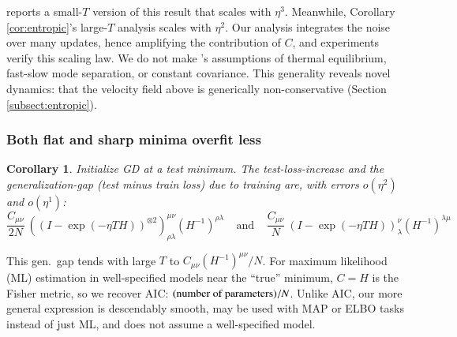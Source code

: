 \documentclass{article}
\theoremstyle{plain}
\newtheorem{cor}{Corollary}
\theoremstyle{definition}
\newcommand{\wrap}[1]{\left(#1\right)}
\newcommand{\rvalue}{\text{\textnormal{rvalue}}}
\newcommand{\sizeddia}[2]{
    \begin{gathered}
        \texttt{[image: ../diagrams/\#1.png]}
    \end{gathered}
}
\newcommand{\sdia}[1]{\protect \sizeddia{#1}{0.10}}
\begin{document}
            \cite{ya19b} reports a small-$T$ version of this result that
            scales with $\eta^3$.  Meanwhile, Corollary \ref{cor:entropic}'s
            large-$T$ analysis scales with $\eta^2$.  Our analysis integrates
            the noise over many updates, hence amplifying the contribution of
            $C$, and experiments verify this scaling law.
            We do not make \cite{we19b}'s assumptions of thermal equilibrium,
            fast-slow mode separation, or constant covariance.  This generality
            reveals novel dynamics: that the velocity field above is
            generically non-conservative (Section \ref{subsect:entropic}).
      
        \subsubsection{Both flat and sharp minima overfit less} \label{subsect:curvature-and-overfitting}
    
            \begin{cor}\label{cor:overfit}
                Initialize GD at a test minimum.  The test-loss-increase and the
                generalization-gap (test minus train loss) due to training are,
                with errors $o(\eta^2)$ and $o(\eta^1)$:
                $$
                    \frac{C_{\mu\nu}}{2N} ~
                        \wrap{(I - \exp(-\eta T H))^{\otimes 2}}^{\mu\nu}_{\rho\lambda}
                        \wrap{H^{-1}}^{\rho\lambda}
                    ~~~~~ \text{and} ~~~~~
                    \frac{C_{\mu\nu}}{N} ~
                        \wrap{I - \exp(-\eta T H)}^{\nu}_{\lambda}
                        \wrap{H^{-1}}^{\lambda\mu}
                $$
            \end{cor}
            This gen.\ gap tends with large $T$ 
            to $C_{\mu\nu}(H^{-1})^{\mu\nu}/N$.  For maximum
            likelihood (ML) estimation in well-specified models near the ``true''
            minimum, $C=H$ is the Fisher metric, so we recover AIC:
            $(\textnormal{number of parameters})/N$.  Unlike AIC, our more general
            expression is descendably smooth, may be used with MAP or ELBO tasks
            instead of just ML, and does not assume a well-specified model.
    
\end{document}
